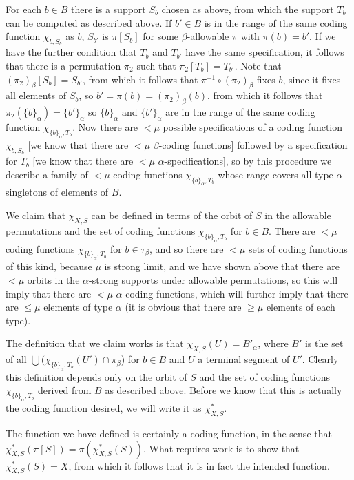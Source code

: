 \documentclass[112pt]{article}
\begin{document}
\begin{description}
For each $b \in B$ there is a support $S_b$ chosen as above, from which the support $T_b$ can be computed as described above.  If $b' \in B$ is in the range of the same coding function $\chi_{b,S_b}$ as $b$, $S_{b'}$ is $\pi[S_{b}]$ for some $\beta$-allowable $\pi$ with $\pi(b) = b'$.
If we have the further condition that $T_b$ and $T_{b'}$ have the same specification, it follows that there is a permutation $\pi_2$ such that $\pi_2[T_b] = T_{b'}$.  Note that $(\pi_2)_\beta[S_b]=S_{b'}$, from which it follows that $\pi^{-1} \circ (\pi_2)_\beta$ fixes $b$, since it fixes all elements of $S_b$, so $b'=\pi(b) = (\pi_2)_\beta(b)$, from which it follows
that $\pi_2(\{b\}_\alpha) = \{b'\}_\alpha$ so $\{b\}_\alpha$ and $\{b'\}_\alpha$ are in the range of the same coding function $\chi_{\{b\}_\alpha,T_b}$.  Now there are $<\mu$ possible specifications of a coding function $\chi_{b,S_b}$ [we know that there are $<\mu$ $\beta$-coding functions]  followed by a specification for $T_b$ [we know that there are $<\mu$ $\alpha$-specifications], so by this procedure we describe a family of $<\mu$ coding functions $\chi_{\{b\}_\alpha,T_b}$ whose range covers all type $\alpha$ singletons of elements of $B$.


We claim that $\chi_{X,S}$ can be defined in terms of the orbit of $S$ in the allowable permutations and the set of coding functions $\chi_{\{b\}_\alpha,T_b}$ for $b \in B$.  There are $<\mu$ coding functions $\chi_{\{b\}_\alpha,T_b}$ for $b \in \tau_\beta$, and so there are $<\mu$ sets of coding functions of this kind, because $\mu$ is strong limit, and we have shown above that there are $<\mu$ orbits in the $\alpha$-strong supports under allowable permutations, so this will imply that there are $<\mu$ $\alpha$-coding functions, which will further imply that there are $\leq \mu$ elements of type $\alpha$ (it is obvious that there are $\geq \mu$ elements of each type).


The definition that we claim works is that $\chi_{X,S}(U) = B'_\alpha$, where $B'$ is the set of all $\bigcup (\chi_{\{b\}_\alpha,T_b}(U')\cap \pi_\beta$) for $b \in B$ and $U$ a terminal segment of  $U'$.  Clearly this definition depends only on the orbit of $S$ and the set of coding functions $\chi_{\{b\}_\alpha,T_b}$ derived from $B$ as described above.  Before we know that this is actually the coding function desired, we will write it as $\chi_{X,S}^*$.

The function we have defined is certainly a coding function, in the sense that $\chi_{X,S}^*(\pi[S]) = \pi(\chi_{X,S}^*(S))$.  What requires work is to show that
$\chi_{X,S}^*(S)=X$, from which it follows that it is in fact the intended function.


\end{description}
\end{document}
